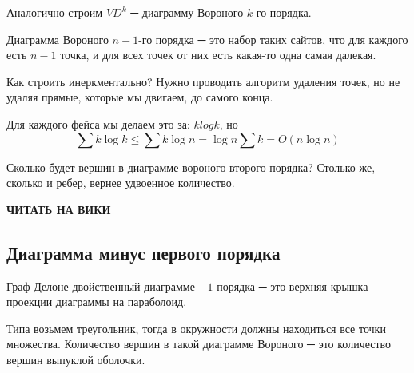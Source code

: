 \documentclass[11pt]{article}
\begin{document}
Аналогично строим $VD^k$ ─ диаграмму Вороного $k$-го порядка.

Диаграмма Вороного $n-1$-го порядка ─ это набор таких сайтов, что
для каждого есть $n-1$ точка, и для всех точек от них есть какая-то
одна самая далекая.

Как строить инеркментально? Нужно проводить алгоритм удаления
точек, но не удаляя прямые, которые мы двигаем, до самого конца.

Для каждого фейса мы делаем это за: $klogk$, но \[\sum{k\log{k}}
   \le \sum{k\log{n}} = \log{n}\sum{k} = O(n\log{n})\]

Сколько будет вершин в диаграмме вороного второго порядка? Столько
же, сколько и ребер, вернее удвоенное количество.

\textbf{ЧИТАТЬ НА ВИКИ}
\subsection{Диаграмма минус первого порядка}
\label{sec-24-6}
Граф Делоне двойственный диаграмме $-1$ порядка ─ это верхняя крышка
проекции диаграммы на параболоид.

Типа возьмем треугольник, тогда в окружности должны находиться все
точки множества. Количество вершин в такой диаграмме Вороного ─
это количество вершин выпуклой оболочки.
\end{document}

